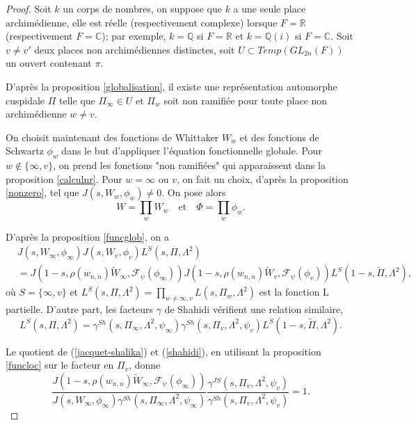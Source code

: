 \documentclass{amsart}
\begin{document}
 \begin{proof}
 Soit $k$ un corps de nombres, on suppose que $k$ a une seule place archimédienne, elle est réelle (respectivement complexe) lorsque $F=\mathbb{R}$ (respectivement $F=\mathbb{C}$); par exemple, $k=\mathbb{Q}$ si $F=\mathbb{R}$ et $k=\mathbb{Q}(i)$ si $F=\mathbb{C}$. Soit $v \neq v'$ deux places non archimédiennes distinctes, soit $U \subset Temp(GL_{2n}(F))$ un ouvert contenant $\pi$.
 
 D'après la proposition \ref{globalisation}, il existe une représentation automorphe cuspidale $\Pi$ telle que $\Pi_{\infty} \in U$ et $\Pi_w$ soit non ramifiée pour toute place non archimédienne $w \neq v$.
 
 On choisit maintenant des fonctions de Whittaker $W_w$ et des fonctions de Schwartz $\phi_w$ dans le but d'appliquer l'équation fonctionnelle globale. Pour $w \not\in \{\infty, v\}$, on prend les fonctions "non ramifiées" qui apparaissent dans la proposition \ref{calculnr}. Pour $w = \infty$ ou $v$, on fait un choix, d'après la proposition \ref{nonzero}, tel que $J(s, W_w, \phi_w) \neq 0$. On pose alors
 $$W = \prod_w W_w \quad \text{et} \quad \Phi  = \prod_w \phi_w.$$
 
 D'après la proposition \ref{funcglob}, on a
 \begin{equation}
 \label{jacquet-shalika}
 \begin{split}
 &J(s, W_\infty, \phi_\infty)J(s, W_v, \phi_v)L^S(s, \Pi, \Lambda^2) \\
 &= J(1-s, \rho(w_{n,n})\tilde{W}_\infty, \mathcal{F}_\psi(\phi_\infty))J(1-s, \rho(w_{n,n})\tilde{W}_v, \mathcal{F}_\psi(\phi_v))L^S(1-s, \tilde{\Pi}, \Lambda^2),
 \end{split}
 \end{equation}
 où $S = \{\infty, v\}$ et $L^S(s, \Pi, \Lambda^2) = \prod_{w \neq \infty,v} L(s, \Pi_w, \Lambda^2)$ est la fonction L partielle. D'autre part, les facteurs $\gamma$ de Shahidi vérifient une relation similaire,
 \begin{equation}
 \label{shahidi}
 L^S(s, \Pi, \Lambda^2) = \gamma^{Sh}(s, \Pi_\infty, \Lambda^2, \psi_\infty)\gamma^{Sh}(s, \Pi_v, \Lambda^2, \psi_v)L^S(1-s, \tilde{\Pi}, \Lambda^2).
 \end{equation}
 
 Le quotient de (\ref{jacquet-shalika}) et (\ref{shahidi}), en utilisant la proposition \ref{funcloc} sur le facteur en $\Pi_v$, donne
 \begin{equation}
 \frac{J(1-s, \rho(w_{n,n})\tilde{W}_\infty, \mathcal{F}_\psi(\phi_\infty))}{J(s, W_\infty, \phi_\infty)\gamma^{Sh}(s, \Pi_\infty, \Lambda^2, \psi_\infty)} \frac{\gamma^{JS}(s, \Pi_v, \Lambda^2, \psi_v)}{\gamma^{Sh}(s, \Pi_v, \Lambda^2, \psi_v)} = 1.
 \end{equation}
 

\end{proof}
\end{document}
